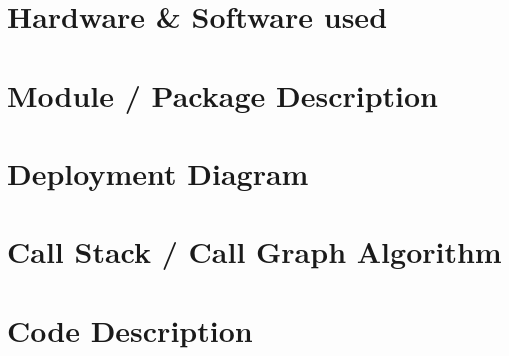 \section{Hardware \& Software used}
\section{Module / Package Description}


\section{Deployment Diagram}

\section{Call Stack / Call Graph Algorithm}

\section{Code Description}
